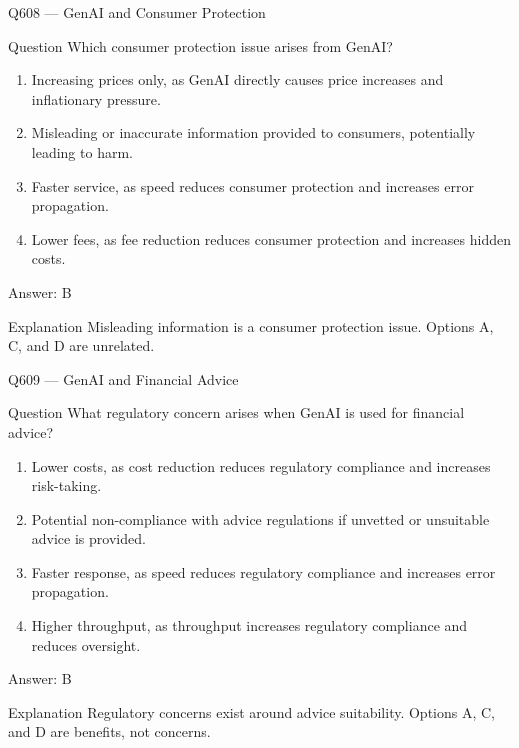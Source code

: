 \documentclass[aspectratio=169,8pt]{beamer}
\begin{document}
	\begin{frame}{Q608 --- GenAI and Consumer Protection}
		\begin{block}{Question}
			Which consumer protection issue arises from GenAI?
			\begin{enumerate}
				\item Increasing prices only, as GenAI directly causes price increases and inflationary pressure.
				\item Misleading or inaccurate information provided to consumers, potentially leading to harm.
				\item Faster service, as speed reduces consumer protection and increases error propagation.
				\item Lower fees, as fee reduction reduces consumer protection and increases hidden costs.
			\end{enumerate}
		\end{block}
		\begin{exampleblock}{Answer: B}\end{exampleblock}
		\begin{block}{Explanation}
			Misleading information is a consumer protection issue. Options A, C, and D are unrelated.
		\end{block}
	\end{frame}
	
	\begin{frame}{Q609 --- GenAI and Financial Advice}
		\begin{block}{Question}
			What regulatory concern arises when GenAI is used for financial advice?
			\begin{enumerate}
				\item Lower costs, as cost reduction reduces regulatory compliance and increases risk-taking.
				\item Potential non-compliance with advice regulations if unvetted or unsuitable advice is provided.
				\item Faster response, as speed reduces regulatory compliance and increases error propagation.
				\item Higher throughput, as throughput increases regulatory compliance and reduces oversight.
			\end{enumerate}
		\end{block}
		\begin{exampleblock}{Answer: B}\end{exampleblock}
		\begin{block}{Explanation}
			Regulatory concerns exist around advice suitability. Options A, C, and D are benefits, not concerns.
		\end{block}
	\end{frame}
	
\end{document}
